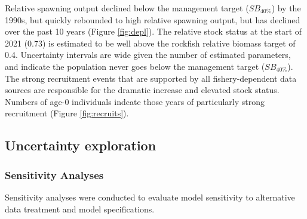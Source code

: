 \documentclass[11pt,
  english,
  a4paper,
]{article}
\begin{document}
\leavevmode\tagmcend\tagstructend\par


Relative spawning output declined below the management target ({\(SB_{40\%}\)\leavevmode\tagmcend\tagstructend}) by the 1990s, but quickly rebounded to high relative spawning output, but has declined over the past 10 years (Figure \ref{fig:depl}). The relative stock status at the start of 2021 (0.73) is estimated to be well above the rockfish relative biomass target of 0.4. Uncertainty intervals are wide given the number of estimated parameters, and indicate the population never goes below the management target ({\(SB_{40\%}\)\leavevmode\tagmcend\tagstructend}). The strong recruitment events that are supported by all fishery-dependent data sources are responsible for the dramatic increase and elevated stock status. Numbers of age-0 individuals indcate those years of particularly strong recruitment (Figure \ref{fig:recruits}).

\leavevmode\tagmcend\tagstructend\par


\hypertarget{uncertainty-exploration}{%
\subsection{Uncertainty exploration}\label{uncertainty-exploration}}

\leavevmode\tagmcend\tagstructend


\hypertarget{sensitivity-analyses}{%
\subsubsection{Sensitivity Analyses}\label{sensitivity-analyses}}

\leavevmode\tagmcend\tagstructend


Sensitivity analyses were conducted to evaluate model sensitivity to alternative data treatment and model specifications.

\leavevmode\tagmcend\tagstructend\par

\end{document}

